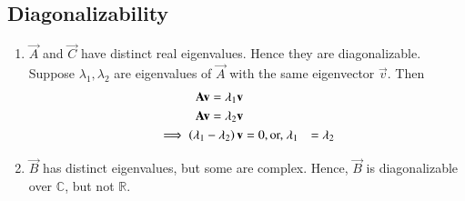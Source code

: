 \subsection{Diagonalizability}
\renewcommand{\theequation}{\theenumi}
\renewcommand{\thefigure}{\theenumi}
\begin{enumerate}[label=\thesubsection.\arabic*.,ref=\thesubsection.\theenumi]

\item  $\vec{A}$ and $\vec{C}$ have distinct real eigenvalues.  Hence they are diagonalizable.
{\proof Suppose $\lambda_1,\lambda_2$ are eigenvalues of $\vec{A}$ with the same eigenvector $\vec{v}$.  Then
\begin{align}
\mathbf{A}\mathbf{v} = \lambda_1 \mathbf{v}
\\
\mathbf{A}\mathbf{v} = \lambda_2 \mathbf{v}
\\
\implies  \left(\lambda_1 - \lambda_2\right)\mathbf{v} &= 0, 
\text{or, } \lambda_1 &= \lambda_2
\end{align}
}
\item $\vec{B}$ has distinct eigenvalues, but some are complex.  Hence, $\vec{B}$ is diagonalizable over $\mathbb{C}$, but not $\mathbb{R}$.


\end{enumerate}
